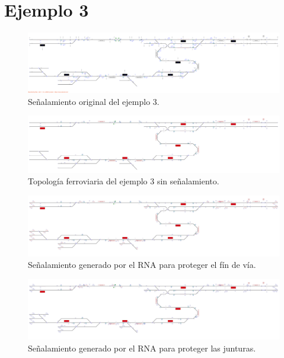 \section{Ejemplo 3}

    \lipsum[1]

    \begin{figure}[h]
        \centering
        \includegraphics[width=1\textwidth]{resultados-obtenidos/ejemplo3/images/3_original.png}
        \centering\caption{Señalamiento original del ejemplo 3.}
    \end{figure}

    \begin{figure}[h]
        \centering
        \includegraphics[width=1\textwidth]{resultados-obtenidos/ejemplo3/images/3_empty.png}
        \centering\caption{Topología ferroviaria del ejemplo 3 sin señalamiento.}
    \end{figure}

    \begin{figure}[h]
        \centering
        \includegraphics[width=1\textwidth]{resultados-obtenidos/ejemplo3/images/3_step1.png}
        \centering\caption{Señalamiento generado por el RNA para proteger el fín de vía.}
    \end{figure}

    \begin{figure}[h]
        \centering
        \includegraphics[width=1\textwidth]{resultados-obtenidos/ejemplo3/images/3_step2.png}
        \centering\caption{Señalamiento generado por el RNA para proteger las junturas.}
    \end{figure}

